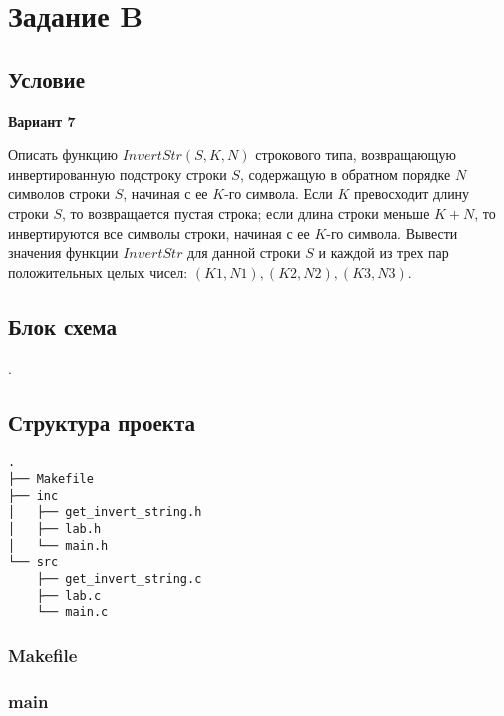 \documentclass[12pt, a4paper]{article}
\begin{document}
\newpage

\section{Задание B}

\subsection{Условие}

\begin{center}
    \textbf{Вариант 7}
\end{center}

Описать функцию $InvertStr(S, K, N)$ строкового типа, возвращающую инвертированную подстроку строки $S$, содержащую в обратном порядке $N$ символов строки $S$, начиная с ее $K$-го символа. Если $K$ превосходит длину строки $S$, то возвращается пустая строка; если длина строки меньше $K + N$, то инвертируются все символы строки, начиная с ее $K$-го символа. Вывести значения функции $InvertStr$ для данной строки $S$ и каждой из трех пар положительных целых чисел: $(K1, N1), (K2, N2), (K3, N3)$.

\subsection{Блок схема}

.

\subsection{Структура проекта}

\begin{verbatim}
.
├── Makefile
├── inc
│   ├── get_invert_string.h
│   ├── lab.h
│   └── main.h
└── src
    ├── get_invert_string.c
    ├── lab.c
    └── main.c
\end{verbatim}

\subsubsection{Makefile}


\subsubsection{main}


\end{document}

